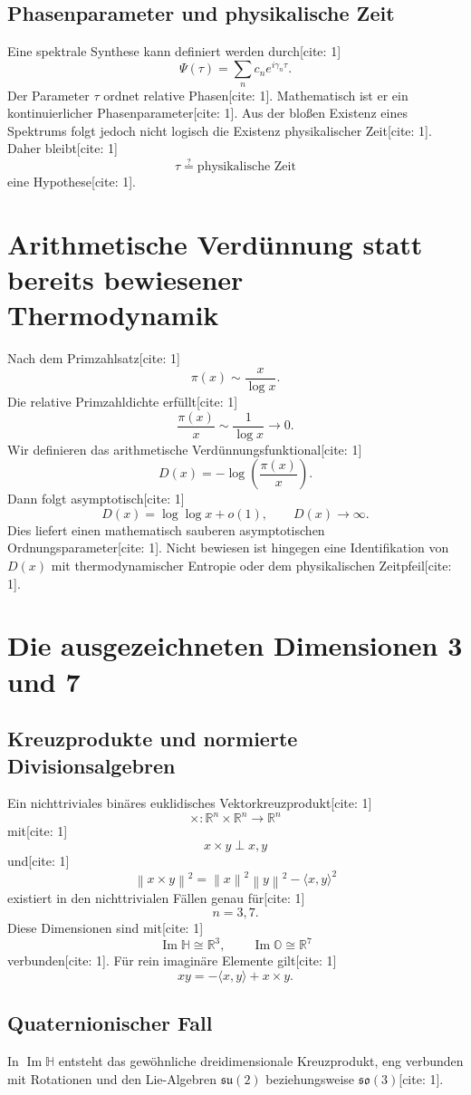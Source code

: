 \documentclass[11pt,a4paper]{article}
\newcommand{\OO}{\mathbb{O}}
\newcommand{\HH}{\mathbb{H}}
\newcommand{\RR}{\mathbb{R}}
\newcommand{\norm}[1]{\left\lVert #1 \right\rVert}
\begin{document}
	\subsection{Phasenparameter und physikalische Zeit}
	Eine spektrale Synthese kann definiert werden durch[cite: 1]
	\[
	\Psi(\tau)=\sum_n c_ne^{i\gamma_n\tau}.
	\]
	Der Parameter $\tau$ ordnet relative Phasen[cite: 1]. Mathematisch ist er ein kontinuierlicher Phasenparameter[cite: 1]. Aus der bloßen Existenz eines Spektrums folgt jedoch nicht logisch die Existenz physikalischer Zeit[cite: 1]. Daher bleibt[cite: 1]
	\[
	\boxed{\tau\stackrel{?}{=}\text{physikalische Zeit}}
	\]
	eine Hypothese[cite: 1].
	
	\section{Arithmetische Verdünnung statt bereits bewiesener Thermodynamik}
	Nach dem Primzahlsatz[cite: 1]
	\[
	\pi(x)\sim\frac{x}{\log x}.
	\]
	Die relative Primzahldichte erfüllt[cite: 1]
	\[
	\frac{\pi(x)}x\sim\frac1{\log x}\to0.
	\]
	Wir definieren das arithmetische Verdünnungsfunktional[cite: 1]
	\[
	\boxed{D(x)=-\log\left(\frac{\pi(x)}x\right).}
	\]
	Dann folgt asymptotisch[cite: 1]
	\[
	D(x)=\log\log x+o(1),\qquad D(x)\to\infty.
	\]
	Dies liefert einen mathematisch sauberen asymptotischen Ordnungsparameter[cite: 1]. Nicht bewiesen ist hingegen eine Identifikation von $D(x)$ mit thermodynamischer Entropie oder dem physikalischen Zeitpfeil[cite: 1].
	
	\section{Die ausgezeichneten Dimensionen 3 und 7}
	\subsection{Kreuzprodukte und normierte Divisionsalgebren}
	Ein nichttriviales binäres euklidisches Vektorkreuzprodukt[cite: 1]
	\[
	\times:\RR^n\times\RR^n\to\RR^n
	\]
	mit[cite: 1]
	\[
	x\times y\perp x,y
	\]
	und[cite: 1]
	\[
	\norm{x\times y}^2=\norm{x}^2\norm{y}^2-\langle x,y\rangle^2
	\]
	existiert in den nichttrivialen Fällen genau für[cite: 1]
	\[
	\boxed{n=3,7.}
	\]
	Diese Dimensionen sind mit[cite: 1]
	\[
	\operatorname{Im}\HH\cong\RR^3,\qquad \operatorname{Im}\OO\cong\RR^7
	\]
	verbunden[cite: 1]. Für rein imaginäre Elemente gilt[cite: 1]
	\[
	xy=-\langle x,y\rangle+x\times y.
	\]
	
	\subsection{Quaternionischer Fall}
	In $\operatorname{Im}\HH$ entsteht das gewöhnliche dreidimensionale Kreuzprodukt, eng verbunden mit Rotationen und den Lie-Algebren $\mathfrak{su}(2)$ beziehungsweise $\mathfrak{so}(3)$[cite: 1].
	
\end{document}

